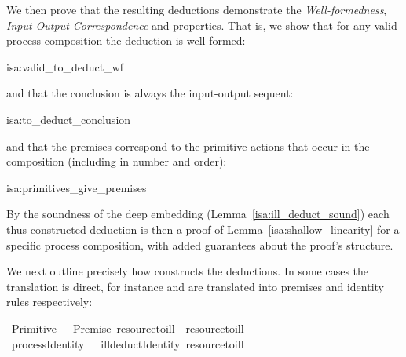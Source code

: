 \documentclass[class=smolathesis,crop=false]{standalone}
\begin{document}
We then prove that the resulting deductions demonstrate the \emph{Well-formedness}, \emph{Input-Output Correspondence} and  properties.
That is, we show that for any valid process composition the deduction is well-formed:
\begin{isalemma}{isa:valid_to_deduct_wf}
  
\end{isalemma}
\noindent
and that the conclusion is always the input-output sequent:
\begin{isalemma}{isa:to_deduct_conclusion}
  
\end{isalemma}
\noindent
and that the premises correspond to the primitive actions that occur in the composition (including in number and order):
\begin{isalemma}{isa:primitives_give_premises}
  
\end{isalemma}

By the soundness of the deep embedding (Lemma~\ref{isa:ill_deduct_sound}) each thus constructed deduction is then a proof of Lemma~\ref{isa:shallow_linearity} for a specific process composition, with added guarantees about the proof's structure.

We next outline precisely how  constructs the deductions.
In some cases the translation is direct, for instance  and  are translated into premises and identity rules respectively:
\begin{isabelle}
\centering
  \ {\isacharparenleft}Primitive\ \ {\isacharequal}\ Premise\ {\isacharbrackleft}resource{\isacharunderscore}to{\isacharunderscore}ill\ \ {\isacharparenleft}resource{\isacharunderscore}to{\isacharunderscore}ill\ \ \isanewline
  \ {\isacharparenleft}process{\isachardot}Identity\ \ {\isacharequal}\ ill{\isacharunderscore}deduct{\isachardot}Identity\ {\isacharparenleft}resource{\isacharunderscore}to{\isacharunderscore}ill\ 
\end{isabelle}
\end{document}
